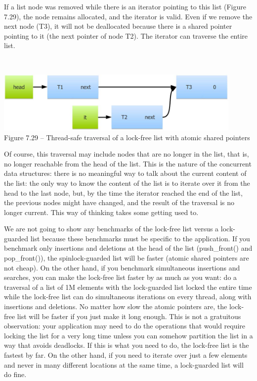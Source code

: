 If a list node was removed while there is an iterator pointing to this list (Figure 7.29), the node remains allocated, and the iterator is valid. Even if we remove the next node (T3), it will not be deallocated because there is a shared pointer pointing to it (the next pointer of node T2). The iterator can traverse the entire list.

\hspace*{\fill} \\ %
\begin{center}
\includegraphics[width=0.9\textwidth]{content/2/chapter7/images/29.jpg}\\
Figure 7.29 – Thread-safe traversal of a lock-free list with atomic shared pointers
\end{center}

Of course, this traversal may include nodes that are no longer in the list, that is, no longer reachable from the head of the list. This is the nature of the concurrent data structures: there is no meaningful way to talk about the current content of the list: the only way to know the content of the list is to iterate over it from the head to the last node, but, by the time the iterator reached the end of the list, the previous nodes might have changed, and the result of the traversal is no longer current. This way of thinking takes some getting used to. 

We are not going to show any benchmarks of the lock-free list versus a lock-guarded list because these benchmarks must be specific to the application. If you benchmark only insertions and deletions at the head of the list (push\_front() and pop\_front()), the spinlock-guarded list will be faster (atomic shared pointers are not cheap). On the other hand, if you benchmark simultaneous insertions and searches, you can make the lock-free list faster by as much as you want: do a traversal of a list of 1M elements with the lock-guarded list locked the entire time while the lock-free list can do simultaneous iterations on every thread, along with insertions and deletions. No matter how slow the atomic pointers are, the lock-free list will be faster if you just make it long enough. This is not a gratuitous observation: your application may need to do the operations that would require locking the list for a very long time unless you can somehow partition the list in a way that avoids deadlocks. If this is what you need to do, the lock-free list is the fastest by far. On the other hand, if you need to iterate over just a few elements and never in many different locations at the same time, a lock-guarded list will do fine. 

